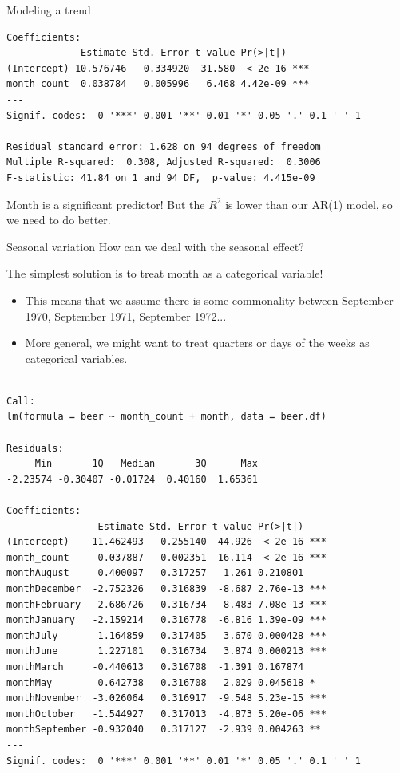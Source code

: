 \documentclass{beamer}\usepackage[]{graphicx}\usepackage[]{color}
\makeatletter
\newenvironment{kframe}{%
 \def\at@end@of@kframe{}%
 \ifinner\ifhmode%
  \def\at@end@of@kframe{\end{minipage}}%
  \begin{minipage}{\columnwidth}%
 \fi\fi%
 \def\FrameCommand##1{\hskip\@totalleftmargin \hskip-\fboxsep
 \colorbox{shadecolor}{##1}\hskip-\fboxsep
     \hskip-\linewidth \hskip-\@totalleftmargin \hskip\columnwidth}%
 \MakeFramed {\advance\hsize-\width
   \@totalleftmargin\z@ \linewidth\hsize
   \@setminipage}}%
 {\par\unskip\endMakeFramed%
 \at@end@of@kframe}
\newenvironment{knitrout}{}{} %
\makeatother
\begin{document}
\begin{darkframes}
\begin{frame}[fragile]{Modeling a trend}
\begin{knitrout}
\begin{kframe}
\begin{verbatim}
Coefficients:
             Estimate Std. Error t value Pr(>|t|)    
(Intercept) 10.576746   0.334920  31.580  < 2e-16 ***
month_count  0.038784   0.005996   6.468 4.42e-09 ***
---
Signif. codes:  0 '***' 0.001 '**' 0.01 '*' 0.05 '.' 0.1 ' ' 1

Residual standard error: 1.628 on 94 degrees of freedom
Multiple R-squared:  0.308,	Adjusted R-squared:  0.3006 
F-statistic: 41.84 on 1 and 94 DF,  p-value: 4.415e-09
\end{verbatim}
\end{kframe}
\end{knitrout}
      \pause
      Month is a significant predictor! But the $R^2$ is lower than our AR(1) model, so we need to do better.
\end{frame}   
    

\begin{frame}{Seasonal variation}
How can we deal with the seasonal effect?
\pause
\bigskip

The simplest solution is to treat month as a categorical variable!
\begin{itemize}
\item This means that we assume there is some commonality between September 1970, September 1971, September 1972...
\item More general, we might want to treat quarters or days of the weeks as categorical variables.
\end{itemize}
\end{frame}

\begin{frame}[fragile]%
    \fontsize{7}{7}\selectfont
      
\begin{knitrout}
\begin{kframe}
\begin{verbatim}

Call:
lm(formula = beer ~ month_count + month, data = beer.df)

Residuals:
     Min       1Q   Median       3Q      Max 
-2.23574 -0.30407 -0.01724  0.40160  1.65361 

Coefficients:
                Estimate Std. Error t value Pr(>|t|)    
(Intercept)    11.462493   0.255140  44.926  < 2e-16 ***
month_count     0.037887   0.002351  16.114  < 2e-16 ***
monthAugust     0.400097   0.317257   1.261 0.210801    
monthDecember  -2.752326   0.316839  -8.687 2.76e-13 ***
monthFebruary  -2.686726   0.316734  -8.483 7.08e-13 ***
monthJanuary   -2.159214   0.316778  -6.816 1.39e-09 ***
monthJuly       1.164859   0.317405   3.670 0.000428 ***
monthJune       1.227101   0.316734   3.874 0.000213 ***
monthMarch     -0.440613   0.316708  -1.391 0.167874    
monthMay        0.642738   0.316708   2.029 0.045618 *  
monthNovember  -3.026064   0.316917  -9.548 5.23e-15 ***
monthOctober   -1.544927   0.317013  -4.873 5.20e-06 ***
monthSeptember -0.932040   0.317127  -2.939 0.004263 ** 
---
Signif. codes:  0 '***' 0.001 '**' 0.01 '*' 0.05 '.' 0.1 ' ' 1


\end{verbatim}
\end{kframe}
\end{knitrout}
\end{frame}
\end{darkframes}
\end{document}

